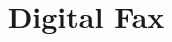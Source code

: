 \documentclass[sigconf,nonacm,9pt]{acmart}
\begin{document}
\title{Digital Fax}

\author{}

\maketitle


\end{document}
